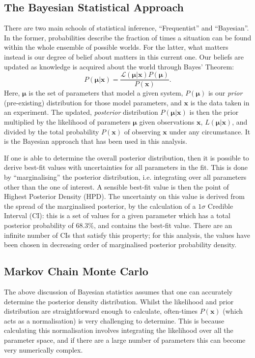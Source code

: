 \subsection{The Bayesian Statistical Approach}
There are two main schools of statistical inference, ``Frequentist'' and ``Bayesian''. In the former, probabilities describe the fraction of times a situation can be found within the whole ensemble of possible worlds. For the latter, what matters instead is our degree of belief about matters in this current one. Our beliefs are updated as knowledge is acquired about the world through Bayes' Theorem:
\begin{equation}
    P\left(\bm{\mu}|\bm{x}\right) = \frac{\mathcal{L}\left(\bm{\mu}|\bm{x}\right)P\left(\bm{\mu}\right)}{P\left(\bm{x}\right)}.
\end{equation}
Here, $\bm{\mu}$ is the set of parameters that model a given system, $P\left(\bm{\mu}\right)$ is our \textit{prior} (pre-existing) distribution for those model parameters, and $\bm{x}$ is the data taken in an experiment. The updated, \textit{posterior} distribution $P\left(\bm{\mu}|\bm{x}\right)$ is then the prior multiplied by the likelihood of parameters $\bm{\mu}$ given observations $\bm{x}$, $L\left(\bm{\mu}|\bm{x}\right)$, and divided by the total probability $P\left(\bm{x}\right)$ of observing $\bm{x}$ under any circumstance. It is the Bayesian approach that has been used in this analysis.

If one is able to determine the overall posterior distribution, then it is possible to derive best-fit values with uncertainties for all parameters in the fit. This is done by ``marginalising'' the posterior distribution, i.e. integrating over all parameters other than the one of interest. A sensible best-fit value is then the point of Highest Posterior Density (HPD). The uncertainty on this value is derived from the spread of the marginalised posterior, by the calculation of a $1\sigma$ Credible Interval (CI): this is a set of values for a given parameter which has a total posterior probability of 68.3\%, and contains the best-fit value. There are an infinite number of CIs that satisfy this property; for this analysis, the values have been chosen in decreasing order of marginalised posterior probability density.

\subsection{Markov Chain Monte Carlo}
The above discussion of Bayesian statistics assumes that one can accurately determine the posterior density distribution. Whilst the likelihood and prior distribution are straightforward enough to calculate, often-times $P\left(\bm{x}\right)$ (which acts as a normalisation) is very challenging to determine. This is because calculating this normalisation involves integrating the likelihood over all the parameter space, and if there are a large number of parameters this can become very numerically complex.


